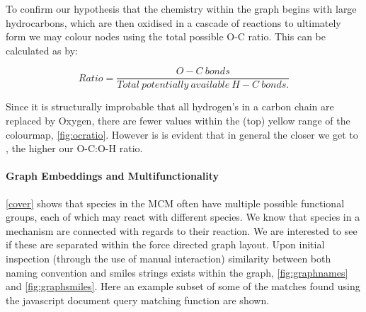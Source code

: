 To confirm our hypothesis that the chemistry within the graph begins with large hydrocarbons, which are then oxidised in a cascade of reactions to ultimately form  we may colour nodes using the total possible O-C ratio. This can be calculated as by:

\begin{equation}
    Ratio = \frac{O-C \ bonds}{Total \ potentially  \  available \ H-C \ bonds.}
\end{equation}

Since it is structurally improbable that all hydrogen's in a carbon chain are replaced by Oxygen, there are fewer values within the (top) yellow range of the colourmap, \autoref{fig:ocratio}. However is is evident that in general the closer we get to , the higher our O-C:O-H ratio.

%
%







\paragraph{Graph Embeddings and Multifunctionality}
\autoref{cover} shows that species in the MCM often have multiple possible functional groups, each of which may react with different species. We know that species in a mechanism are connected with regards to their reaction. We are interested to see if these are separated within the force directed graph layout. Upon initial inspection (through the use of manual interaction) similarity between both naming convention and smiles strings exists within the graph, \autoref{fig:graphnames} and \autoref{fig:graphsmiles}. Here an example subset of some of the matches found using the javascript document query matching function are shown.




